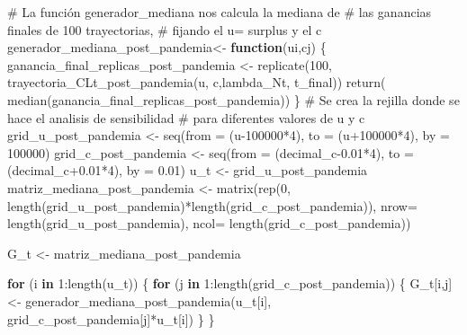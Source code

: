 \documentclass[
  us-letterpaper,
]{scrreprt}
\newenvironment{Shaded}{\begin{snugshade}}{\end{snugshade}}
\newcommand{\AttributeTok}[1]{\textcolor[rgb]{0.40,0.45,0.13}{#1}}
\newcommand{\CommentTok}[1]{\textcolor[rgb]{0.37,0.37,0.37}{#1}}
\newcommand{\ControlFlowTok}[1]{\textcolor[rgb]{0.00,0.23,0.31}{\textbf{#1}}}
\newcommand{\DecValTok}[1]{\textcolor[rgb]{0.68,0.00,0.00}{#1}}
\newcommand{\FloatTok}[1]{\textcolor[rgb]{0.68,0.00,0.00}{#1}}
\newcommand{\FunctionTok}[1]{\textcolor[rgb]{0.28,0.35,0.67}{#1}}
\newcommand{\NormalTok}[1]{\textcolor[rgb]{0.00,0.23,0.31}{#1}}
\newcommand{\OtherTok}[1]{\textcolor[rgb]{0.00,0.23,0.31}{#1}}
\newcommand{\SpecialCharTok}[1]{\textcolor[rgb]{0.37,0.37,0.37}{#1}}
\theoremstyle{definition}
\theoremstyle{plain}
\theoremstyle{plain}
\theoremstyle{remark}
\begin{document}
\begin{Shaded}
\begin{Highlighting}[]
\CommentTok{\# La función generador\_mediana nos calcula la mediana de }
\CommentTok{\# las ganancias finales de 100 trayectorias, }
\CommentTok{\# fijando el u= surplus y el c}
\NormalTok{generador\_mediana\_post\_pandemia}\OtherTok{\textless{}{-}} \ControlFlowTok{function}\NormalTok{(ui,cj)}
\NormalTok{  \{}
\NormalTok{  ganancia\_final\_replicas\_post\_pandemia }\OtherTok{\textless{}{-}} \FunctionTok{replicate}\NormalTok{(}\DecValTok{100}\NormalTok{,}
           \FunctionTok{trayectoria\_CLt\_post\_pandemia}\NormalTok{(u, c,lambda\_Nt, t\_final))}
    \FunctionTok{return}\NormalTok{( }\FunctionTok{median}\NormalTok{(ganancia\_final\_replicas\_post\_pandemia))}
\NormalTok{  \}}
\CommentTok{\# Se crea la rejilla donde se hace el analisis de sensibilidad}
\CommentTok{\# para diferentes valores de u y c}
\NormalTok{grid\_u\_post\_pandemia }\OtherTok{\textless{}{-}} \FunctionTok{seq}\NormalTok{(}\AttributeTok{from =}\NormalTok{ (u}\DecValTok{{-}100000}\SpecialCharTok{*}\DecValTok{4}\NormalTok{), }
                            \AttributeTok{to =}\NormalTok{ (u}\SpecialCharTok{+}\DecValTok{100000}\SpecialCharTok{*}\DecValTok{4}\NormalTok{), }
                            \AttributeTok{by =} \DecValTok{100000}\NormalTok{)}
\NormalTok{grid\_c\_post\_pandemia }\OtherTok{\textless{}{-}} \FunctionTok{seq}\NormalTok{(}\AttributeTok{from =}\NormalTok{ (decimal\_c}\FloatTok{{-}0.01}\SpecialCharTok{*}\DecValTok{4}\NormalTok{), }
                            \AttributeTok{to =}\NormalTok{ (decimal\_c}\FloatTok{+0.01}\SpecialCharTok{*}\DecValTok{4}\NormalTok{), }
                            \AttributeTok{by =} \FloatTok{0.01}\NormalTok{)}
\NormalTok{u\_t }\OtherTok{\textless{}{-}}\NormalTok{ grid\_u\_post\_pandemia}
\NormalTok{matriz\_mediana\_post\_pandemia }\OtherTok{\textless{}{-}} \FunctionTok{matrix}\NormalTok{(}\FunctionTok{rep}\NormalTok{(}\DecValTok{0}\NormalTok{, }
      \FunctionTok{length}\NormalTok{(grid\_u\_post\_pandemia)}\SpecialCharTok{*}\FunctionTok{length}\NormalTok{(grid\_c\_post\_pandemia)),}
      \AttributeTok{nrow=} \FunctionTok{length}\NormalTok{(grid\_u\_post\_pandemia), }
      \AttributeTok{ncol=} \FunctionTok{length}\NormalTok{(grid\_c\_post\_pandemia))}

\NormalTok{G\_t }\OtherTok{\textless{}{-}}\NormalTok{ matriz\_mediana\_post\_pandemia}

\ControlFlowTok{for}\NormalTok{ (i }\ControlFlowTok{in} \DecValTok{1}\SpecialCharTok{:}\FunctionTok{length}\NormalTok{(u\_t)) }
\NormalTok{\{}
  \ControlFlowTok{for}\NormalTok{ (j }\ControlFlowTok{in} \DecValTok{1}\SpecialCharTok{:}\FunctionTok{length}\NormalTok{(grid\_c\_post\_pandemia)) }
\NormalTok{  \{}
\NormalTok{    G\_t[i,j] }\OtherTok{\textless{}{-}} \FunctionTok{generador\_mediana\_post\_pandemia}\NormalTok{(u\_t[i], }
\NormalTok{                                  grid\_c\_post\_pandemia[j]}\SpecialCharTok{*}\NormalTok{u\_t[i])}
\NormalTok{  \}}
\NormalTok{\} }


\end{Highlighting}
\end{Shaded}
\end{document}
